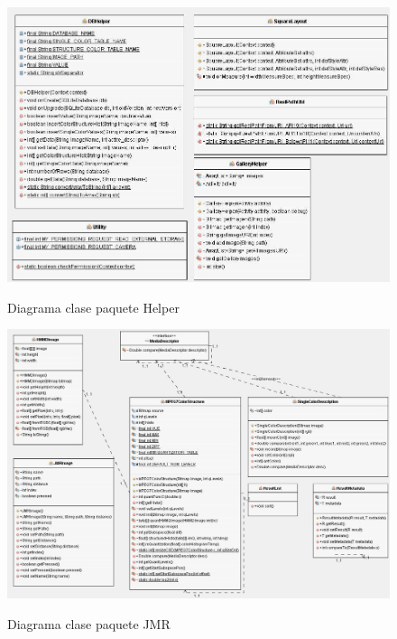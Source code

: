 \begin{figure}[H] %
\centering
\includegraphics[scale=0.6]{imagenes/diagrama4.jpg}  %
\label{diagrama4}
\caption{Diagrama clase paquete Helper}
\end{figure}

\begin{figure}[H] %
\centering
\includegraphics[scale=0.6]{imagenes/diagrama5.jpg}  %
\label{diagrama5}
\caption{Diagrama clase paquete JMR}
\end{figure}

